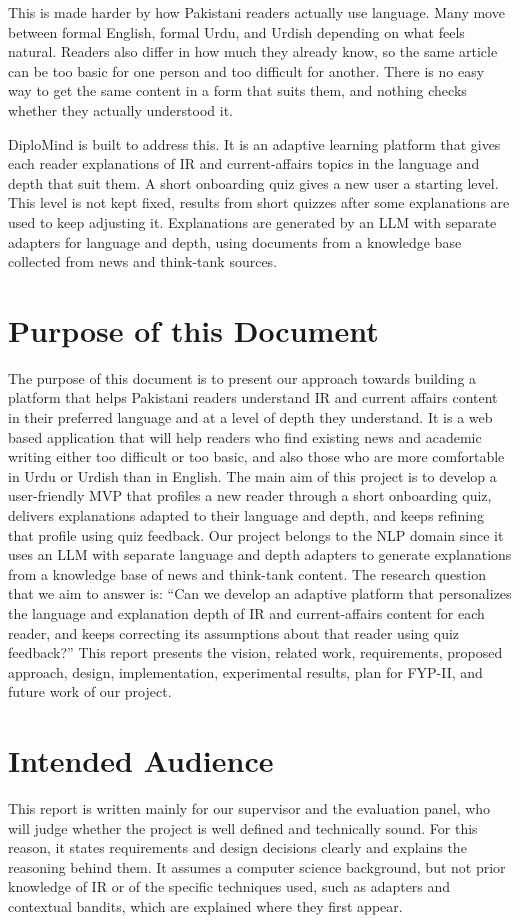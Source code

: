 \documentclass{FastFyp}
\begin{document}
This is made harder by how Pakistani readers actually use language. Many move between formal English, formal Urdu, and Urdish depending on what feels natural. Readers also differ in how much they already know, so the same article can be too basic for one person and too difficult for another. There is no easy way to get the same content in a form that suits them, and nothing checks whether they actually understood it.

DiploMind is built to address this. It is an adaptive learning platform that gives each reader explanations of IR and current-affairs topics in the language and depth that suit them. A short onboarding quiz gives a new user a starting level. This level is not kept fixed, results from short quizzes after some explanations are used to keep adjusting it. Explanations are generated by an LLM with separate adapters for language and depth, using documents from a knowledge base collected from news and think-tank sources.
\section{Purpose of this Document}
The purpose of this document is to present our approach towards building a platform that helps Pakistani
readers understand IR and current affairs content in their preferred language and at a level of depth they understand. It is a web based application that will help readers who find existing news and academic writing either too difficult or too basic, and also those who are more comfortable in Urdu or Urdish than in English. The main aim of this project is to develop a user-friendly MVP that profiles a new reader through a short onboarding quiz, delivers explanations adapted to their language and depth, and keeps refining that profile using quiz feedback. Our project belongs to the NLP domain since it uses an LLM with separate language and depth adapters to generate explanations from a knowledge base of news and think-tank content. The research question that we aim to answer is: ``Can we develop an adaptive platform that personalizes the language and explanation depth of IR and current-affairs content for each reader, and keeps correcting its assumptions about that reader using quiz feedback?'' This report presents the vision, related work, requirements, proposed approach, design, implementation, experimental results, plan for FYP-II, and future work of our project.
\section{Intended Audience}
This report is written mainly for our supervisor and the evaluation panel, who will judge whether the project is well defined and technically sound. For this reason, it states requirements and design decisions clearly and explains the reasoning behind them. It assumes a computer science background, but not prior knowledge of IR or of the specific techniques used, such as adapters and contextual bandits, which are explained where they first appear.
\end{document}
